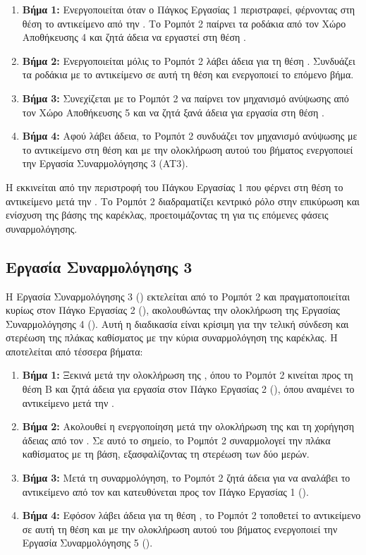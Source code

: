\begin{enumerate}
    \item \textbf{Βήμα 1:} Ενεργοποιείται όταν ο Πάγκος Εργασίας 1 περιστραφεί, φέρνοντας στη θέση  το αντικείμενο από την . Το Ρομπότ 2 παίρνει τα ροδάκια από τον Χώρο Αποθήκευσης 4 και ζητά άδεια να εργαστεί στη θέση .
    \item \textbf{Βήμα 2:} Ενεργοποιείται μόλις το Ρομπότ 2 λάβει άδεια για τη θέση . Συνδυάζει τα ροδάκια με το αντικείμενο σε αυτή τη θέση και ενεργοποιεί το επόμενο βήμα.
    \item \textbf{Βήμα 3:} Συνεχίζεται με το Ρομπότ 2 να παίρνει τον μηχανισμό ανύψωσης από τον Χώρο Αποθήκευσης 5 και να ζητά ξανά άδεια για εργασία στη θέση .
    \item \textbf{Βήμα 4:} Αφού λάβει άδεια, το Ρομπότ 2 συνδυάζει τον μηχανισμό ανύψωσης με το αντικείμενο στη θέση  και με την ολοκλήρωση αυτού του βήματος ενεργοποιεί την Εργασία Συναρμολόγησης 3 (AT3).
\end{enumerate}

Η  εκκινείται από την περιστροφή του Πάγκου Εργασίας 1 που φέρνει στη θέση  το αντικείμενο μετά την . Το Ρομπότ 2 διαδραματίζει κεντρικό ρόλο στην επικύρωση και ενίσχυση της βάσης της καρέκλας, προετοιμάζοντας τη για τις επόμενες φάσεις συναρμολόγησης.

\subsection{Εργασία Συναρμολόγησης 3}
\noindent Η Εργασία Συναρμολόγησης 3 () εκτελείται από το Ρομπότ 2 και πραγματοποιείται κυρίως στον Πάγκο Εργασίας 2 (), ακολουθώντας την ολοκλήρωση της Εργασίας Συναρμολόγησης 4 (). Αυτή η διαδικασία είναι κρίσιμη για την τελική σύνδεση και στερέωση της πλάκας καθίσματος με την κύρια συναρμολόγηση της καρέκλας. Η  αποτελείται από τέσσερα βήματα:

\begin{enumerate}
    \item \textbf{Βήμα 1:} Ξεκινά μετά την ολοκλήρωση της , όπου το Ρομπότ 2 κινείται προς τη θέση Β και ζητά άδεια για εργασία στον Πάγκο Εργασίας 2 (), όπου αναμένει το αντικείμενο μετά την .
    \item \textbf{Βήμα 2:} Ακολουθεί η ενεργοποίηση μετά την ολοκλήρωση της  και τη χορήγηση άδειας από τον . Σε αυτό το σημείο, το Ρομπότ 2 συναρμολογεί την πλάκα καθίσματος με τη βάση, εξασφαλίζοντας τη στερέωση των δύο μερών.
    \item \textbf{Βήμα 3:} Μετά τη συναρμολόγηση, το Ρομπότ 2 ζητά άδεια για να αναλάβει το αντικείμενο από τον  και κατευθύνεται προς τον Πάγκο Εργασίας 1 ().
    \item \textbf{Βήμα 4:} Εφόσον λάβει άδεια για τη θέση , το Ρομπότ 2 τοποθετεί το αντικείμενο σε αυτή τη θέση και με την ολοκλήρωση αυτού του βήματος ενεργοποιεί την Εργασία Συναρμολόγησης 5 ().
\end{enumerate}

